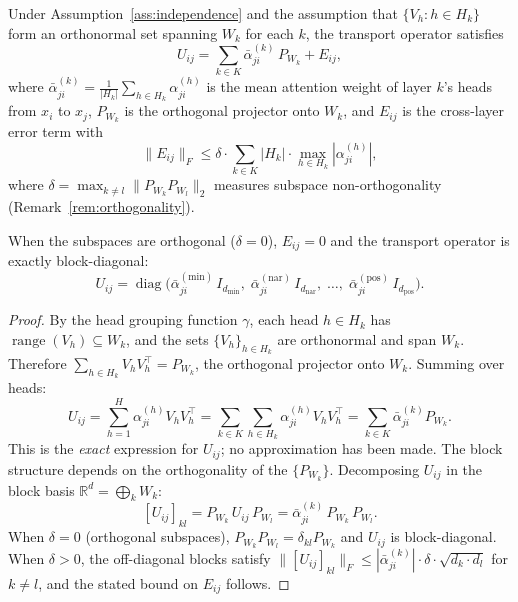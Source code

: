 \begin{proposition}
\label{prop:block-structure}
Under Assumption~\ref{ass:independence} and the assumption that $\{V_h : h \in H_k\}$
form an orthonormal set spanning $W_k$ for each $k$, the transport operator satisfies
\[
    U_{ij} = \sum_{k \in K} \bar{\alpha}_{ji}^{(k)}\, P_{W_k} + E_{ij},
\]
where $\bar{\alpha}_{ji}^{(k)} = \frac{1}{|H_k|} \sum_{h \in H_k} \alpha_{ji}^{(h)}$ is
the mean attention weight of layer $k$'s heads from $x_i$ to $x_j$, $P_{W_k}$ is the
orthogonal projector onto $W_k$, and $E_{ij}$ is the cross-layer error term with
\[
    \|E_{ij}\|_F \leq \delta \cdot \sum_{k \in K} |H_k| \cdot \max_{h \in H_k}
    |\alpha_{ji}^{(h)}|,
\]
where $\delta = \max_{k \neq l} \|P_{W_k} P_{W_l}\|_2$ measures subspace non-orthogonality
(Remark~\ref{rem:orthogonality}).

When the subspaces are orthogonal ($\delta = 0$), $E_{ij} = 0$ and the transport operator
is exactly block-diagonal:
\[
    U_{ij} = \operatorname{diag}\!\big(\bar{\alpha}_{ji}^{(\mathrm{min})}\,
    I_{d_{\mathrm{min}}},\; \bar{\alpha}_{ji}^{(\mathrm{nar})}\, I_{d_{\mathrm{nar}}},\;
    \ldots,\; \bar{\alpha}_{ji}^{(\mathrm{pos})}\, I_{d_{\mathrm{pos}}}\big).
\]
\end{proposition}

\begin{proof}
By the head grouping function $\gamma$, each head $h \in H_k$ has
$\operatorname{range}(V_h) \subseteq W_k$, and the sets $\{V_h\}_{h \in H_k}$ are
orthonormal and span $W_k$. Therefore $\sum_{h \in H_k} V_h V_h^\top = P_{W_k}$, the
orthogonal projector onto $W_k$. Summing over heads:
\[
    U_{ij} = \sum_{h=1}^{H} \alpha_{ji}^{(h)} V_h V_h^\top
           = \sum_{k \in K} \sum_{h \in H_k} \alpha_{ji}^{(h)} V_h V_h^\top
           = \sum_{k \in K} \bar{\alpha}_{ji}^{(k)} P_{W_k}.
\]
This is the \emph{exact} expression for $U_{ij}$; no approximation has been made. The
block structure depends on the orthogonality of the $\{P_{W_k}\}$. Decomposing $U_{ij}$
in the block basis $\mathbb{R}^d = \bigoplus_k W_k$:
\[
    [U_{ij}]_{kl} = P_{W_k}\, U_{ij}\, P_{W_l}
    = \bar{\alpha}_{ji}^{(k)}\, P_{W_k}\, P_{W_l}.
\]
When $\delta = 0$ (orthogonal subspaces), $P_{W_k} P_{W_l} = \delta_{kl} P_{W_k}$ and
$U_{ij}$ is block-diagonal. When $\delta > 0$, the off-diagonal blocks satisfy
$\|[U_{ij}]_{kl}\|_F \leq |\bar{\alpha}_{ji}^{(k)}| \cdot \delta \cdot \sqrt{d_k \cdot
d_l}$ for $k \neq l$, and the stated bound on $E_{ij}$ follows.
\end{proof}

